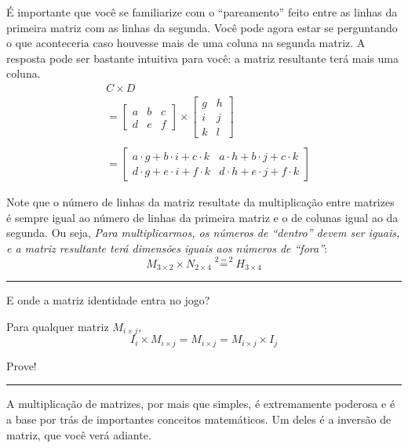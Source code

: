 \documentclass[
  letterpaper,
  DIV=11,
  numbers=noendperiod]{scrreprt}
\begin{document}
É importante que você se familiarize com o ``pareamento'' feito entre as
linhas da primeira matriz com as linhas da segunda. Você pode agora
estar se perguntando o que aconteceria caso houvesse mais de uma coluna
na segunda matriz. A resposta pode ser bastante intuitiva para você: a
matriz resultante terá mais uma coluna. \[
\begin{aligned}
    &C \times D  \\
    &= 
    \begin{bmatrix}
        a & b & c \\
        d & e & f
    \end{bmatrix}
    \times 
    \begin{bmatrix}
        g & h \\
        i & j\\
        k & l
    \end{bmatrix}\\  \\
    &=
    \begin{bmatrix}
        a \cdot g + b \cdot i + c \cdot k & a \cdot h + b \cdot j + c \cdot k\\
        d \cdot g + e \cdot i + f \cdot k & d \cdot h + e \cdot j + f \cdot k
    \end{bmatrix}
\end{aligned}
\]

Note que o número de linhas da matriz resultate da multiplicação entre
matrizes é sempre igual ao número de linhas da primeira matriz e o de
colunas igual ao da segunda. Ou seja, \emph{Para multiplicarmos, os
números de ``dentro'' devem ser iguais, e a matriz resultante terá
dimensões iguais aos números de ``fora''}: \[
M_{3\times 2} \times N_{2 \times 4} \stackrel{2=2}{=} H_{3 \times 4}
\]

\begin{center}\rule{0.5\linewidth}{0.5pt}\end{center}

E onde a matriz identidade entra no jogo?

Para qualquer matriz \(M_{i\times j}\), \[
I_{i} \times M_{i\times j} = M_{i\times j} = M_{i\times j}\times I_{j}
\]

Prove!

\begin{center}\rule{0.5\linewidth}{0.5pt}\end{center}

A multiplicação de matrizes, por mais que simples, é extremamente
poderosa e é a base por trás de importantes conceitos matemáticos. Um
deles é a inversão de matriz, que você verá adiante.
\end{document}
